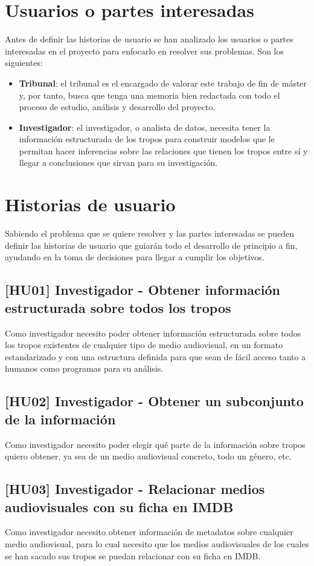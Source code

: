 \section{Usuarios o partes interesadas}
Antes de definir las historias de usuario se han analizado los usuarios o partes interesadas en el proyecto para enfocarlo en resolver sus problemas. Son los siguientes:
\begin{itemize}
    \item \textbf{Tribunal}: el tribunal es el encargado de valorar este trabajo de fin de máster y, por tanto, busca que tenga una memoria bien redactada con todo el proceso de estudio, análisis y desarrollo del proyecto.
    \item \textbf{Investigador}: el investigador, o analista de datos, necesita tener la información estructurada de los tropos para construir modelos que le permitan hacer inferencias sobre las relaciones que tienen los tropos entre sí y llegar a conclusiones que sirvan para su investigación.
\end{itemize}

\section{Historias de usuario}
Sabiendo el problema que se quiere resolver y las partes interesadas se pueden definir las historias de usuario que guiarán todo el desarrollo de principio a fin, ayudando en la toma de decisiones para llegar a cumplir los objetivos.

\subsection{[HU01] Investigador - Obtener información estructurada sobre todos los tropos}
Como investigador necesito poder obtener información estructurada sobre todos los tropos existentes de cualquier tipo de medio audiovisual, en un formato estandarizado y con una estructura definida para que sean de fácil acceso tanto a humanos como programas para su análisis.

\subsection{[HU02] Investigador - Obtener un subconjunto de la información}
Como investigador necesito poder elegir qué parte de la información sobre tropos quiero obtener, ya sea de un medio audiovisual concreto, todo un género, etc.

\subsection{[HU03] Investigador - Relacionar medios audiovisuales con su ficha en IMDB}
Como investigador necesito obtener información de metadatos sobre cualquier medio audiovisual, para lo cual necesito que los medios audiovisuales de los cuales se han sacado sus tropos se puedan relacionar con su ficha en IMDB.

